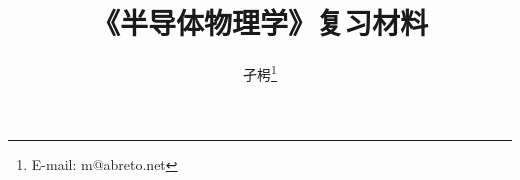 \documentclass[hyperref, UTF8]{ctexbook}
\begin{document}
\graphicspath{{figures/}}
\title{《半导体物理学》复习材料}
\author{孑枵\thanks{E-mail: m@abreto.net}}
\frontmatter
\maketitle

\tableofcontents

\mainmatter


\end{document}

